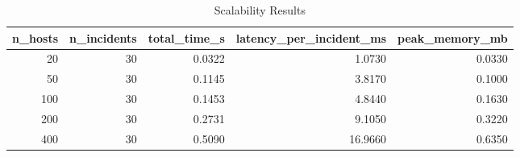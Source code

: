 \begin{table}
\caption{Scalability Results}
\label{tab:scalability_results}
\begin{tabular}{rrrrr}
\toprule
n_hosts & n_incidents & total_time_s & latency_per_incident_ms & peak_memory_mb \\
\midrule
20 & 30 & 0.0322 & 1.0730 & 0.0330 \\
50 & 30 & 0.1145 & 3.8170 & 0.1000 \\
100 & 30 & 0.1453 & 4.8440 & 0.1630 \\
200 & 30 & 0.2731 & 9.1050 & 0.3220 \\
400 & 30 & 0.5090 & 16.9660 & 0.6350 \\
\bottomrule
\end{tabular}
\end{table}
